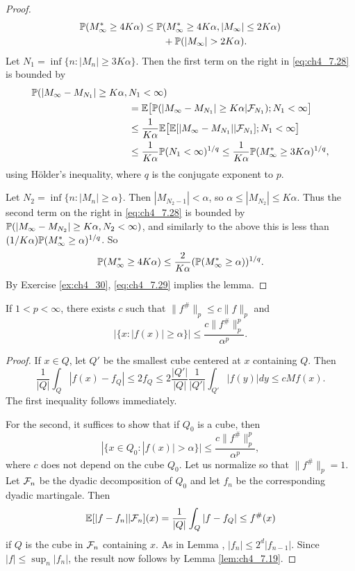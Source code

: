 \begin{proof}
\begin{align}\label{eq:ch4_7.28}
    \P(M_\infty^* \geq 4K\alpha) &\leq \P(M_\infty^* \geq 4K\alpha, |M_\infty| \leq 2K\alpha) \\
    &\qquad+ \P(|M_\infty| > 2K\alpha). \notag
\end{align}
Let $N_1 = \inf\{n: |M_n| \geq 3K\alpha\}$. Then the first term on the right in \eqref{eq:ch4_7.28} is bounded by
\begin{align*}
    \P(|M_\infty - M_{N_1}| \geq K\alpha, \,&N_1 < \infty) \\
    &= \E\big[\P(|M_\infty - M_{N_1}| \geq K\alpha\mid \FC_{N_1}); N_1 < \infty\big] \\
    &\leq \frac{1}{K\alpha}\E\big[\E[|M_\infty - M_{N_1}|\mid \FC_{N_1}]; N_1 < \infty\big] \\
    &\leq \frac{1}{K\alpha}\P(N_1 < \infty)^{1/q} \leq \frac{1}{K\alpha}\P(M_\infty^* \geq 3K\alpha)^{1/q},
\end{align*}
using H\"older's inequality, where $q$ is the conjugate exponent to $p$.

\mpagebreak

Let $N_2 = \inf\{n: |M_n| \geq \alpha\}$. Then $|M_{N_2-1}| < \alpha$, so $\alpha \leq |M_{N_2}| \leq K\alpha$. Thus the second term on the right in \eqref{eq:ch4_7.28} is bounded by $\P(|M_\infty - M_{N_2}| \geq K\alpha, N_2 < \infty)$, and similarly to the above this is less than $(1/K\alpha)\P(M_\infty^* \geq \alpha)^{1/q}$. So
\begin{equation}\label{eq:ch4_7.29}
    \P(M_\infty^* \geq 4K\alpha) \leq \frac{2}{K\alpha}(\P(M_\infty^* \geq \alpha))^{1/q}.
\end{equation}
By Exercise \ref{ex:ch4_30}, \eqref{eq:ch4_7.29} implies the lemma.
\end{proof}


\begin{proposition}\label{prop:ch4_7.20}
If $1 < p < \infty$, there exists $c$ such that $\|f^\#\|_p \leq c\|f\|_p$ and
\[
    |\{x : |f(x)| \geq \alpha\}| \leq \frac{c\|f^\#\|_p^p}{\alpha^p}.
\]
\end{proposition}

\begin{proof}
If $x \in Q$, let $Q'$ be the smallest cube centered at $x$ containing $Q$. Then
\[
    \frac{1}{|Q|}\int_Q |f(x) - f_Q| \leq 2f_Q \leq 2\frac{|Q'|}{|Q|}\frac{1}{|Q'|}\int_{Q'} |f(y)|dy \leq cMf(x).
\]
The first inequality follows immediately.

For the second, it suffices to show that if $Q_0$ is a cube, then
\[
    |\{x \in Q_0 : |f(x)| > \alpha\}| \leq \frac{c\|f^\#\|_p^p}{\alpha^p},
\]
where $c$ does not depend on the cube $Q_0$. Let us normalize so that $\|f^\#\|_p = 1$. Let $\FC_n$ be the dyadic decomposition of $Q_0$ and let $f_n$ be the corresponding dyadic martingale. Then
\[
    \E[|f - f_n|\mid \FC_n](x) = \frac{1}{|Q|}\int_Q |f - f_Q| \leq f^\#(x)
\]
if $Q$ is the cube in $\FC_n$ containing $x$. As in Lemma , $|f_n| \leq 2^d|f_{n-1}|$. Since $|f| \leq \sup_n |f_n|$, the result now follows by Lemma \ref{lem:ch4_7.19}.
\end{proof}

